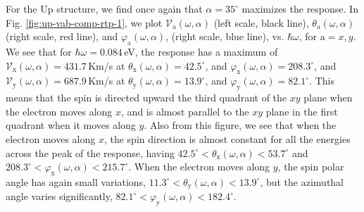 \documentclass[floatfix,prb,aps,superscriptaddress,showpacs,11pt,preprint,letterpaper]{revtex4}
\begin{document}
For the Up structure, we find once again that  $\alpha=35^{\circ}$ maximizes
the response. In Fig. \ref{fig:up-vab-comp-rtp-1}, we plot
$\mathcal{V}_{\mathrm{a}} (\omega,\alpha)$ (left scale, black line),
$\theta_{\mathrm{a}} (\omega,\alpha)$ (right scale, red line), and
$\varphi_{\mathrm{a}} (\omega,\alpha)$, (right scale, blue line), vs.
$\hbar\omega$, for $\mathrm{a}=x,y$. We see that for $\hbar\omega=0.084$\,eV,
the response has a maximum of $\mathcal{V}_{\mathrm{x}}
(\omega,\alpha)=431.7$\,Km/s at $\theta_{\mathrm{x}}(\omega,\alpha) =
42.5^{\circ}$, and $\varphi_{\mathrm{x}}(\omega,\alpha) = 208.3^{\circ}$, and
$\mathcal{V}_{\mathrm{y}} (\omega,\alpha)=687.9$\,Km/s at
$\theta_{\mathrm{y}}(\omega,\alpha) = 13.9^{\circ}$, and $\varphi_{\mathrm{y}}
(\omega,\alpha) = 82.1^{\circ}$. This means that the spin is directed upward
the third quadrant of the $xy$ plane when the electron moves along
$x$, and is almost parallel to the $xy$ plane in the first quadrant
when it moves along $y$. Also from this figure, we see that when the electron
moves along $x$, the spin direction is almost constant for all the energies
across the peak of the response, having $42.5^{\circ}<\theta_{\mathrm{x}}
(\omega,\alpha)<53.7^{\circ}$ and $208.3^{\circ}<\varphi_{\mathrm{x}}
(\omega,\alpha)<215.7^{\circ}$. When the electron moves along $y$, the spin
polar angle has again small variations, $11.3^{\circ}<
\theta_{\mathrm{y}}(\omega,\alpha)<13.9^{\circ}$, but the azimuthal angle
varies significantly, $82.1^{\circ}< \varphi_{\mathrm{y}}
(\omega,\alpha)<182.4^{\circ}$.
\end{document}
